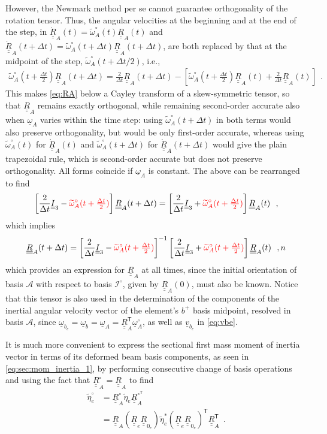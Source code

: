 \documentclass[12pt,a4paper,oneside,english]{abntex2} %
\newcommand{\fix}[1]{{\color{red}#1}}
\newcommand{\vect}[1]{\underline{#1}}
\def\tens#1{\underline{\underline{#1}}}
\def\til#1{\widetilde{#1}}
\def\lb{\left[}
\def\rb{\right]}
\def\lp{\left(}
\def\rp{\right)}
\def\T{\mathsf{T}}
\def\A{\mathcal{A}}
\def\bp{b^+}
\def\Io{\mathcal{I}^{\circ}}
\def\Ithree{\tens{I}_3}
\def\R{\tens{R}}
\def\RA{\R_A}
\def\RAT{\R^\T_A}
\def\RAdot{\dot{\R}_A}
\def\RAo{\R^{\circ}_A}
\def\RAoT{\R^{\circ^\T}_A}
\def\om{\vect{\omega}_b}
\def\omA{\vect{\omega}_A}
\def\omAo{\omA^{\circ}}
\def\omAtil{\til{\omega}_A}
\def\omAtilo{\omAtil^{\circ}}
\def\etatile{\til{\eta}_e}
\def\etatilse{\til{\eta}_e^*}
\def\etatiloe{\til{\eta}_e^\circ}
\def\vbe{\vect{v}_{b_e}}
\def\ombe{\vect{\omega}_{b_e}}
\def\Re{\R_{e}}
\def\Rze{\R_{0_e}}
\def\RRze{\lp\Re\Rze\rp}
\def\RRzeT{\RRze^\T}
\def\dt{\Delta t}
\def\todt{\frac{2}{\dt}}
\def\dt{\Delta t}
\begin{document}
\begin{apendicesenv}
\fix{However, the Newmark method per se cannot guarantee orthogonality of the rotation tensor. Thus, the angular velocities at the beginning and at the end of the step, in $\RAdot(t)=\omAtilo(t)\RA(t)$ and $\RAdot(t+\dt)=\omAtilo(t+\dt)\RA(t+\dt)$, are both replaced by that at the midpoint of the step, $\omAtilo(t+\dt/2)$, i.e.,
\begin{align}
    \omAtilo(t+\tfrac{\dt}{2})\RA(t+\dt) = \todt \RA(t+\dt) - \lb \omAtilo(t+\tfrac{\dt}{2})\RA(t) + \todt \RA(t) \rb  \ \ .
    \label{eq:RAdot_mid}
\end{align}
This makes \cref{eq:RA} below a Cayley transform of a skew-symmetric tensor, so that $\RA$ remains exactly orthogonal, while remaining second-order accurate also when $\omA$ varies within the time step: using $\omAtilo(t+\dt)$ in both terms would also preserve orthogonality, but would be only first-order accurate, whereas using $\omAtilo(t)$ for $\RAdot(t)$ and $\omAtilo(t+\dt)$ for $\RAdot(t+\dt)$ would give the plain trapezoidal rule, which is second-order accurate but does not preserve orthogonality. All forms coincide if $\omA$ is constant.} The above can be rearranged to find
\begin{align}
    \lb \todt\Ithree - \fix{\omAtilo(t+\tfrac{\dt}{2})} \rb \RA(t+\dt) = \lb \todt\Ithree + \fix{\omAtilo(t+\tfrac{\dt}{2})} \rb \RA(t) \ \ ,
    \label{eq:RApartial}
\end{align}
which implies
\begin{align}
     \RA(t+\dt) = \lb \todt\Ithree - \fix{\omAtilo(t+\tfrac{\dt}{2})} \rb^{-1} \lb \todt\Ithree + \fix{\omAtilo(t+\tfrac{\dt}{2})} \rb \RA(t) \ \ ,
n     \label{eq:RA}
\end{align}
which provides an expression for $\RA$ at all times, since the initial orientation of basis $\A$ with respect to basis $\Io$, given by $\RA(0)$, must also be known. Notice that this tensor is also used in the determination of the components of the inertial angular velocity vector of the element's $\bp$ basis midpoint, resolved in basis $\A$, since $\ombe = \om = \omA = \RAT\omAo$, as well as $\vbe$ in \cref{eq:vbe}.

It is much more convenient to express the sectional first mass moment of inertia vector in terms of its deformed beam basis components, as seen in \cref{eq:sec:mom_inertia_1}, by performing consecutive change of basis operations and using the fact that $\RAo = \RA$ to find
\begin{align}
    \etatiloe &= \RAo\etatile\RAoT
    \nonumber \\
    &= \RA\RRze\etatilse\RRzeT\RAT \ \ .
    \label{eq:etatiloe}
\end{align}


\end{apendicesenv}
\end{document}
